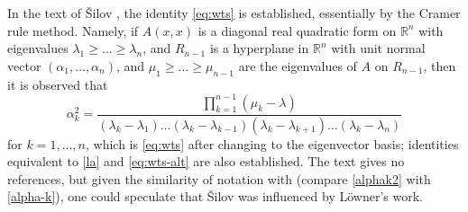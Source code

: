 \documentclass{amsart}
\newcommand\R{\mathbb{R}}
\begin{document}
In the text of \v{S}ilov \cite[Section 10.27]{silov}, the identity \eqref{eq:wts} is established, essentially by the Cramer rule method.  Namely, if $A(x,x)$ is a diagonal real quadratic form on $\R^n$ with eigenvalues $\lambda_1 \geq \dots \geq \lambda_n$, and $R_{n-1}$ is a hyperplane in $\R^n$ with unit normal vector $(\alpha_1,\dots,\alpha_n)$, and $\mu_1 \geq \dots \geq \mu_{n-1}$ are the eigenvalues of $A$ on $R_{n-1}$, then it is observed that 
\begin{equation}\label{alphak2}
\alpha_k^2 = \frac{\prod_{k=1}^{n-1} (\mu_k - \lambda)}{(\lambda_k - \lambda_1) \dots (\lambda_k - \lambda_{k-1}) (\lambda_k - \lambda_{k+1}) \dots (\lambda_k-\lambda_n)}
\end{equation}
for $k=1,\dots,n$, which is \eqref{eq:wts} after changing to the eigenvector basis; identities equivalent to \eqref{la} and \eqref{eq:wts-alt} are also established.  The text \cite{silov} gives no references, but given the similarity of notation with \cite{Lowner} (compare \eqref{alphak2} with \eqref{alpha-k}), one could speculate that \v{S}ilov was influenced by L\"owner's work.
\end{document}
